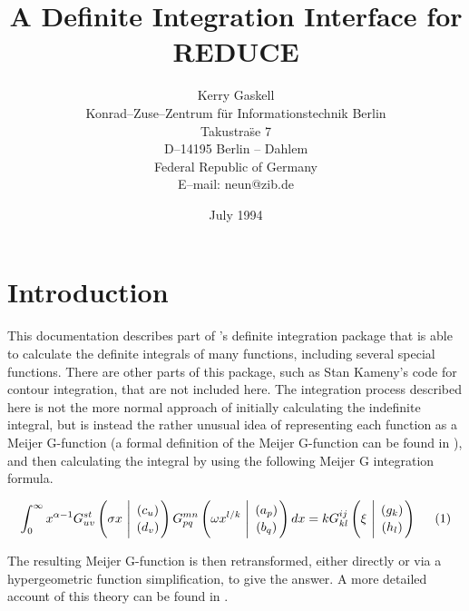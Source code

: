 \date{July 1994}
\title{A Definite Integration Interface for REDUCE}
\author{Kerry Gaskell \\
Konrad--Zuse--Zentrum f\"ur Informationstechnik Berlin\\
Takustra\"se 7 \\
D--14195 Berlin -- Dahlem \\
Federal Republic of Germany \\[0.05in]
E--mail: neun@zib.de\footnotemark[1]}


\maketitle
{}

\section{Introduction}
This documentation describes part of \REDUCE's definite
integration package that is able to calculate the definite integrals of
many functions, including several special functions.  There are other
parts of this package, such as Stan Kameny's code for contour integration,
that are not included here.  The integration process described here is not
the more normal approach of initially calculating the indefinite integral,
but is instead the rather unusual idea of representing each function as a
Meijer G-function (a formal definition of the Meijer G-function can be
found in \cite {Prudnikov}), and then calculating the integral by using
the following Meijer G integration formula.

\begin{displaymath}
\int_{0}^{\infty} x^{\alpha-1} G^{s t}_{u v} 
\left( \sigma x \  \Bigg\vert \  {( c_u) \atop (d_v)} \right) 
G^{m n}_{p q} \left( \omega x^{l/k} \  \Bigg\vert \ {(a_p) \atop (b_q)}
\right) dx = k G^{i j}_{k l} \left( \xi \ \Bigg\vert \ 
{(g_k) \atop (h_l)} \right)  \hspace{5mm} (1)
\end{displaymath}

The resulting Meijer G-function is then retransformed, either directly
or via a hypergeometric function simplification, to give
the answer. A more detailed account of this theory can be found in 
\cite {Adamchik:90}.

